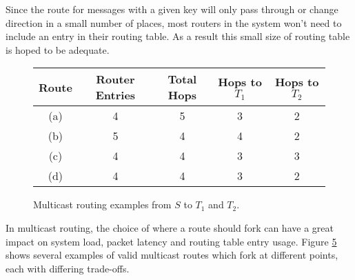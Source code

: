 				Since the route for messages with a given key will only pass through or
				change direction in a small number of places, most routers in the system
				won't need to include an entry in their routing table. As a result this
				small size of routing table is hoped to be adequate.
				
				\begin{figure}[t!]
					\begin{subfigure}[b]{0.24\textwidth}
						\center
						
						\caption{}
						\label{fig:multicast-routing-a}
					\end{subfigure}
					\begin{subfigure}[b]{0.24\textwidth}
						\center
						
						\caption{}
						\label{fig:multicast-routing-b}
					\end{subfigure}
					\begin{subfigure}[b]{0.24\textwidth}
						\center
						
						\caption{}
						\label{fig:multicast-routing-c}
					\end{subfigure}
					\begin{subfigure}[b]{0.24\textwidth}
						\center
						
						\caption{}
						\label{fig:multicast-routing-d}
					\end{subfigure}
					
					\center
					\begin{tabular}{c c c c c}
						\toprule
							Route & Router Entries & Total Hops & Hops to $T_1$ & Hops to $T_2$ \\
						\midrule
							(a)   & 4              & 5          & 3             & 2             \\
							(b)   & 5              & 4          & 4             & 2             \\
							(c)   & 4              & 4          & 3             & 3             \\
							(d)   & 4              & 4          & 3             & 2             \\
						\bottomrule
					\end{tabular}
					
					\caption[Multicast routing examples.]{Multicast routing examples from
					$S$ to $T_1$ and $T_2$.}
					\label{fig:multicast-routing}
				\end{figure}
				
				In multicast routing, the choice of where a route should fork can have a
				great impact on system load, packet latency and routing table entry
				usage. Figure \ref{fig:multicast-routing} shows several examples of
				valid multicast routes which fork at different points, each with
				differing trade-offs.
				
